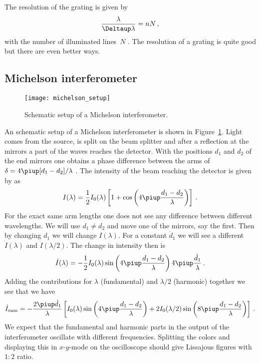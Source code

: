\documentclass[11pt, english, fleqn, DIV=15, headinclude, BCOR=2cm]{scrreprt}
\begin{document}
The resolution of the grating is given by
\[
    \frac{\lambda}{\Deltaup \lambda} = n N \,,
\]
with the number of illuminated lines~$N$
\parencite{wikipedia/optisches_gitter}. The resolution of a grating is quite
good but there are even better ways.

\subsection{Michelson interferometer}


\begin{figure}
    \centering
    \texttt{[image: michelson\_setup]}
    \caption{%
        Schematic setup of a Michelson interferometer.
    }
    \label{fig:michelson-setup}
\end{figure}

An schematic setup of a Michelson interferometer is shown in
Figure~\ref{fig:michelson-setup}. Light comes from the source, is split on the
beam splitter and after a reflection at the mirrors a part of the waves
reaches the detector. With the positions $d_1$ and $d_2$ of the end mirrors
one obtains a phase difference between the arms of $\delta = 4 \piup [d_1 -
d_2] / \lambda$ \parencite[559]{meschede-gerthsen_24}. The intensity of the
beam reaching the detector is given by \textcite[559]{meschede-gerthsen_24} as
\begin{equation}
    \label{eq:I_of_lambda}
    I(\lambda) = \frac12 I_0(\lambda) \sbr{
        1 +
        \cos\del{4 \piup \frac{d_1 - d_2}{\lambda}}
    } \,.
\end{equation}
For the exact same arm lengths one does not see any difference between
different wavelengths. We will use $d_1 \neq d_2$ and move one of the mirrors,
say the first. Then by changing $d_1$ we will change $I(\lambda)$. For a
constant $\dot d_1$ we will see a different $\dot I(\lambda)$ and $\dot
I(\lambda/2)$. The change in intensity then is
\[
    \dot I(\lambda) = - \frac12 I_0(\lambda) 
        \sin\del{4 \piup \frac{d_1 - d_2}{\lambda}}
        4 \piup \frac{\dot d_1}{\lambda} \,.
\]
Adding the contributions for $\lambda$ (fundamental) and $\lambda/2$ (harmonic)
together we see that we have
\[
    \dot I_\text{sum}
    =
    - \frac{2 \piup \dot d_1}{\lambda}
    \sbr{
        I_0(\lambda) 
        \sin\del{4 \piup \frac{d_1 - d_2}{\lambda}}
        +
        2 I_0(\lambda/2) 
        \sin\del{8 \piup \frac{d_1 - d_2}{\lambda}}
    } \,.
\]
We expect that the fundamental and harmonic parts in the output of the
interferometer oscillate with different frequencies. Splitting the colors and
displaying this in $x$-$y$-mode on the oscilloscope should give Lissajous
figures with $1:2$ ratio.
\end{document}
